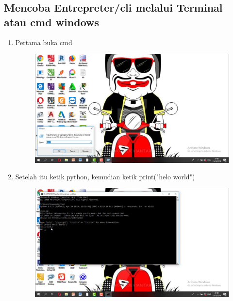 \begin{enumerate}
\begin{enumerate}
\begin{enumerate}
\begin{enumerate}
\section*{Mencoba Entrepreter/cli melalui Terminal atau cmd
windows}
\begin{enumerate}
\item  Pertama buka cmd
\begin{figure}[h]
    \centering
    \includegraphics[scale=0.2]{gambar/29.png}
    \caption{}
    \label{fig:my_label}
\end{figure}
\item  Setelah itu ketik python, kemudian ketik print("helo world")
\begin{figure}[h]
    \centering
    \includegraphics[scale=0.2]{gambar/30.png}
    \caption{}
    \label{fig:my_label}
\end{figure}

\end{enumerate}
\end{enumerate}
\end{enumerate}
\end{enumerate}
\end{enumerate}
